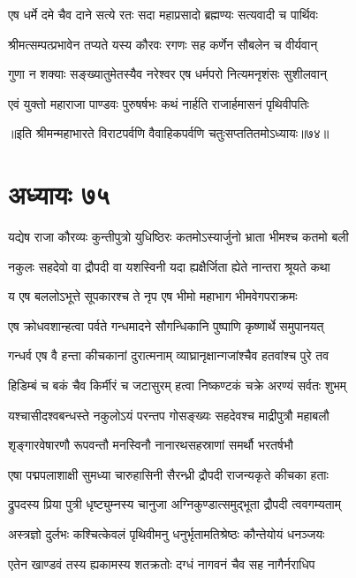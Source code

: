 \twolineshloka
{एष धर्मे दमे चैव दाने सत्ये रतः सदा}
{महाप्रसादो ब्रह्मण्यः सत्यवादी च पार्थिवः}


\twolineshloka
{श्रीमत्सम्पत्प्रभावेन तप्यते यस्य कौरवः}
{रगणः सह कर्णेन सौबलेन च वीर्यवान्}


\twolineshloka
{गुणा न शक्याः सङ्ख्यातुमेतस्यैव नरेश्वर}
{एष धर्मपरो नित्यमनृशंसः सुशीलवान्}


\twolineshloka
{एवं युक्तो महाराजा पाण्डवः पुरुषर्षभः}
{कथं नार्हति राजार्हमासनं पृथिवीपतिः}

॥इति श्रीमन्महाभारते विराटपर्वणि वैवाहिकपर्वणि चतुःसप्ततितमोऽध्यायः॥७४॥

\chapter{अध्यायः ७५}

\twolineshloka
{यद्येष राजा कौरव्यः कुन्तीपुत्रो युधिष्ठिरः}
{कतमोऽस्यार्जुनो भ्राता भीमश्च कतमो बली}


\twolineshloka
{नकुलः सहदेवो वा द्रौपदी वा यशस्विनी}
{यदा ह्यक्षैर्जिता ह्येते नान्तरा श्रूयते कथा}




\twolineshloka
{य एष बललोऽभूत्ते सूपकारश्च ते नृप}
{एष भीमो महाभाग भीमवेगपराक्रमः}


\twolineshloka
{एष क्रोधवशान्हत्वा पर्वते गन्धमादने}
{सौगन्धिकानि पुष्पाणि कृष्णार्थे समुपानयत्}


\twolineshloka
{गन्धर्व एष वै हन्ता कीचकानां दुरात्मनाम्}
{व्याघ्रानृक्षान्गजांश्चैव हतवांश्च पुरे तव}


\twolineshloka
{हिडिम्बं च बकं चैव किर्मीरं च जटासुरम्}
{हत्वा निष्कण्टकं चक्रे अरण्यं सर्वतः शुभम्}


\twolineshloka
{यश्चासीदश्वबन्धस्ते नकुलोऽयं परन्तप}
{गोसङ्ख्यः सहदेवश्च माद्रीपुत्रौ महाबलौ}


\twolineshloka
{शृङ्गारवेषारणौ रूपवन्तौ मनस्विनौ}
{नानारथसहस्राणां समर्थौ भरतर्षभौ}


\twolineshloka
{एषा पद्मपलाशाक्षी सुमध्या चारुहासिनी}
{सैरन्ध्री द्रौपदी राजन्यकृते कीचका हताः}


\twolineshloka
{द्रुपदस्य प्रिया पुत्री धृष्ट्युम्नस्य चानुजा}
{अग्निकुण्डात्समुद्भूता द्रौपदी त्ववगम्यताम्}



\twolineshloka
{अस्त्रज्ञो दुर्लभः कश्चित्केवलं पृथिवीमनु}
{धनुर्भृतामतिश्रेष्ठः कौन्तेयोयं धनञ्जयः}


\twolineshloka
{एतेन खाण्डवं तस्य ह्यकामस्य शतक्रतोः}
{दग्धं नागवनं चैव सह नागैर्नराधिप}


